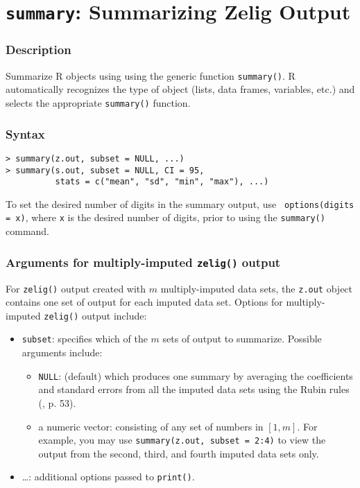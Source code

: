 \section{{\tt summary}: Summarizing Zelig Output}
\label{ss:summary}

\subsubsection{Description}

Summarize R objects using using the generic function {\tt summary()}.
R automatically recognizes the type of object (lists, data frames,
variables, etc.) and selects the appropriate {\tt summary()} function.

\subsubsection{Syntax}

\begin{verbatim}
> summary(z.out, subset = NULL, ...)
> summary(s.out, subset = NULL, CI = 95, 
          stats = c("mean", "sd", "min", "max"), ...)
\end{verbatim}
To set the desired number of digits in the summary output, use {\tt
  options(digits = x)}, where {\tt x} is the desired number of digits,
prior to using the {\tt summary()} command.

\subsubsection{Arguments for multiply-imputed {\tt zelig()} output}
For {\tt zelig()} output created with $m$ multiply-imputed data sets,
the {\tt z.out} object contains one set of output for each imputed
data set.  Options for multiply-imputed {\tt zelig()} output include:
   \begin{itemize}
   \item {\tt subset}: specifies which of the $m$ sets of output to
     summarize.  Possible arguments include:
       \begin{itemize}
       \item {\tt NULL}: (default) which produces one summary by
         averaging the coefficients and standard errors from all the
         imputed data sets using the Rubin rules (,
         p. 53).
       \item a numeric vector: consisting of any set of numbers in
         $[1,m]$.  For example, you may use {\tt summary(z.out,
           subset = 2:4)} to view the output from the second, third,
         and fourth imputed data sets only.  
       \end{itemize}
     \item{\dots}: additional options passed to {\tt print()}.  
    \end{itemize}

